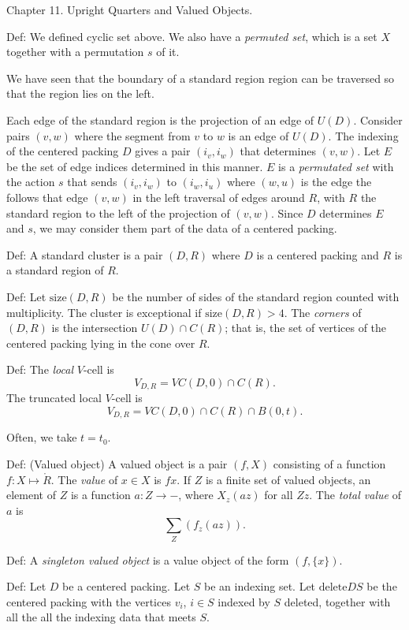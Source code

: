 Chapter 11. Upright Quarters and Valued Objects.

Def: We defined cyclic set above.  We also have a {\it permuted set}, which
is a set $X$ together with a permutation $s$ of it.

We have seen that the boundary of a standard region region can be traversed
so that the region lies on the left.

Each edge of the standard region is the projection of an edge of
$U(D)$. Consider pairs $(v,w)$ where the segment from $v$ to $w$
is an edge of $U(D)$.  The indexing of the centered packing $D$
gives a pair $(i_v,i_w)$ that determines $(v,w)$.  Let $E$ be the
set of edge indices determined in this manner.  $E$ is a {\it
permutated set\/} with the action $s$ that sends $(i_v,i_w)$ to
$(i_w,i_u)$ where $(w,u)$ is the edge the follows that edge
$(v,w)$ in the left traversal of edges around $R$, with $R$ the
standard region to the left of the projection of $(v,w)$.  Since
$D$ determines $E$ and $s$, we may consider them part of the data
of a centered packing.

Def:  A standard cluster is a pair $(D,R)$ where $D$ is a centered
packing and $R$ is a standard region of $R$.

Def:  Let $\text{size}(D,R)$ be the number of sides of the
standard region counted with multiplicity.  The cluster is
exceptional if $\text{size}(D,R) > 4$.  The {\it corners} of
$(D,R)$ is the intersection $U(D) \cap C(R)$; that is, the set of
vertices of the centered packing lying in the cone over $R$.

Def: The {\it local } $V$-cell is
$$V_{D,R} = VC(D,0) \cap C(R).$$
The truncated local $V$-cell is
$$V_{D,R} = VC(D,0) \cap C(R) \cap B(0,t).$$

Often, we take $t = t_0$.

Def: (Valued object)  A valued object is a pair $(f,X)$ consisting
of a function $f:X \mapsto \ring{R}$.  The
{\it value\/} of $x\in X$ is $f x$.  If $Z$ is a finite
set of valued objects, an element of $Z$ is a function $a:Z \to -$,
where $X_z(a z)$ for all $Z z$.  The {\it total value} of $a$ is
$$\sum_Z (f_z (a z)).$$

Def: A {\it singleton valued object} is a value object of the form
$(f,\{x\})$.

Def: Let $D$ be a centered packing.  Let $S$ be an indexing set.
Let $\text{delete} D S$ be the centered packing with the vertices
$v_i$, $i \in S$ indexed by $S$ deleted, together with all the all
the indexing data that meets $S$.

